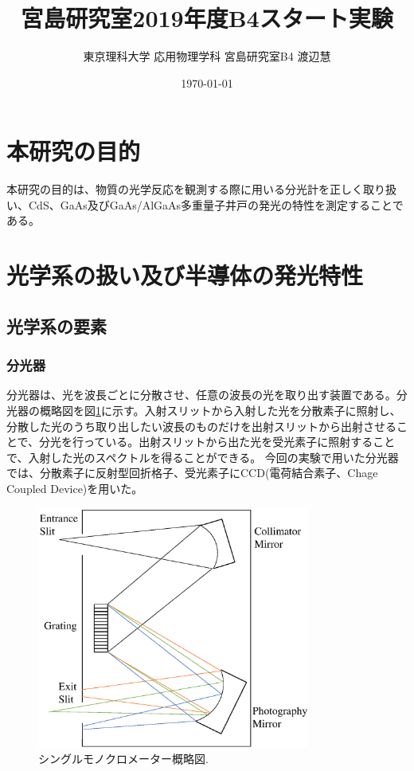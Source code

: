 \documentclass[11pt,a4j]{jsarticle}
\title{宮島研究室2019年度B4スタート実験}
\author{東京理科大学 応用物理学科 宮島研究室B4 渡辺慧}
\date{\today}
\begin{document}
\maketitle %

\thispagestyle{empty}%
\clearpage
\addtocounter{page}{-1}

\newpage

\tableofcontents %

\thispagestyle{empty}%
\clearpage
\addtocounter{page}{-1}


\newpage
\section{本研究の目的}
本研究の目的は、物質の光学反応を観測する際に用いる分光計を正しく取り扱い、CdS、GaAs及びGaAs/AlGaAs多重量子井戸の発光の特性を測定することである。
\newpage
\section{光学系の扱い及び半導体の発光特性}

\subsection{光学系の要素}
\subsubsection{分光器}

分光器は、光を波長ごとに分散させ、任意の波長の光を取り出す装置である。分光器の概略図を図\ref{fig_monochro1}に示す。入射スリットから入射した光を分散素子に照射し、分散した光のうち取り出したい波長のものだけを出射スリットから出射させることで、分光を行っている。出射スリットから出た光を受光素子に照射することで、入射した光のスペクトルを得ることができる。
今回の実験で用いた分光器では、分散素子に反射型回折格子、受光素子にCCD(電荷結合素子、Chage Coupled Device)を用いた。

\begin{figure}[h]
 \centering
 \includegraphics[clip,width=9cm]{monochromator.eps}
 \caption{シングルモノクロメーター概略図.}
 \label{fig_monochro1}
\end{figure}
\end{document}
